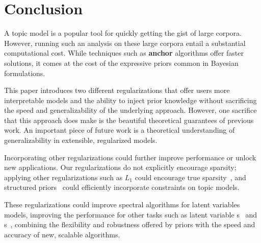 \section{Conclusion}
\label{sec:conclusion}

A topic model is a popular tool for quickly getting the gist of large
corpora.  However, running such an analysis on these large corpora
entail a substantial computational cost.  While techniques such as
{\bf anchor} algorithms offer faster solutions, it comes at the cost
of the expressive priors common in Bayesian formulations.

This paper introduces two different regularizations that offer users more
interpretable models and the ability to inject prior knowledge without
sacrificing the speed and generalizability of the underlying approach.  However,
one sacrifice that this approach does make is the beautiful theoretical
guarantees of previous work.  An important piece of future work is a theoretical
understanding of generalizability in extensible, regularized models.

Incorporating other regularizations could further improve performance
or unlock new applications.  Our regularizations do not explicitly
encourage sparsity; applying other regularizations such as $L_1$ could
encourage true sparsity~\cite{Tibshirani-1994}, and structured
priors~\cite{andrzejewski-09} could efficiently incorporate
constraints on topic models.

These regularizations could improve spectral
algorithms for latent variables models, improving the performance for
other  tasks such as latent variable
s~\cite{cohen-13b} and s~\cite{anandkumar-12:hmm},
combining the flexibility and robustness offered by priors with the
speed and accuracy of new, scalable algorithms.

